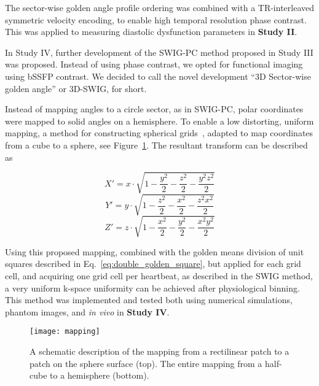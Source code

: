 The sector-wise golden angle profile ordering was combined with a TR-interleaved symmetric velocity encoding, to enable high temporal resolution phase contrast. This was applied to measuring diastolic dysfunction parameters in \textbf{Study II}.

In Study IV, further development of the SWIG-PC method proposed in Study III was proposed. Instead of using phase contrast, we opted for functional imaging using bSSFP contrast. We decided to call the novel development ``3D Sector-wise golden angle'' or 3D-SWIG, for short.

Instead of mapping angles to a circle sector, as in SWIG-PC, polar coordinates were mapped to solid angles on a hemisphere. To enable a low distorting, uniform mapping, a method for constructing spherical grids~\cite{Rosca2011}, adapted to map coordinates from a cube to a sphere, see Figure~\ref{fig:mapping}. The resultant transform can be described as

\begin{equation}
    X' = x \cdot \sqrt{1-\frac{y^2}{2}-\frac{z^2}{2}-\frac{y^2z^2}{2}}
\end{equation}
\begin{equation}
    Y' = y \cdot \sqrt{1-\frac{z^2}{2}-\frac{x^2}{2}-\frac{z^2x^2}{2}}
\end{equation}
\begin{equation}
    Z' = z \cdot \sqrt{1-\frac{x^2}{2}-\frac{y^2}{2}-\frac{x^2y^2}{2}}
\end{equation}

Using this proposed mapping, combined with the golden means division of unit squares described in Eq.~\ref{eq:double_golden_square}, but applied for each grid cell, and acquiring one grid cell per heartbeat, as described in the SWIG method, a very uniform k-space uniformity can be achieved after physiological binning. This method was implemented and tested both using numerical simulations, phantom images, and \emph{in vivo} in \textbf{Study IV}.

\begin{figure}
    \centering
    \texttt{[image: mapping]}
    \caption{A schematic description of the mapping from a rectilinear patch to a patch on the sphere surface (top). The entire mapping from a half-cube to a hemisphere (bottom). }
    \label{fig:mapping}
\end{figure}